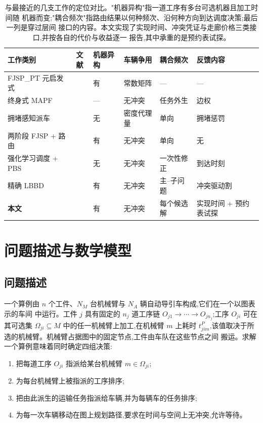 \documentclass[manuscript,screen,review]{acmart}
\begin{document}
\begin{table}[t]
\caption{与最接近的几支工作的定位对比。"机器异构"指一道工序有多台可选机器且加工时间随
机器而变;"耦合频次"指路由结果以何种频次、沿何种方向到达调度决策;最后一列是穿过层间
接口的内容。本文实现了实现时间、冲突凭证与走廊价格三类接口,并按各自的代价与收益逐一
报告,其中承重的是预约表试探。}
\label{tab:related}
\footnotesize
\begin{tabular}{@{}lclll l@{}}
\toprule
工作类别 & 文献 & 机器异构 & 车辆争用 & 耦合频次 & 反馈内容 \\
\midrule
FJSP\_PT 元启发式 & \cite{meng2025cp,qin2026knowledge,fu2025integrated}
  & 有 & 常数矩阵 & --- & --- \\
终身式 MAPF & \cite{zhang2024guidance}
  & --- & 无冲突 & 任务外生 & 边权 \\
拥堵感知派车 & \cite{kim2026congestion}
  & 无 & 密度代理量 & 单向 & 拥堵惩罚 \\
两阶段 FJSP + 路由 & \cite{sun2023integrated}
  & 有 & 无冲突 & 单向 & 无 \\
强化学习调度 + PBS & \cite{li2026framework}
  & 无 & 无冲突 & 一次性修正 & 到达时刻 \\
精确 LBBD & \cite{vanos2026exact}
  & 有 & 无冲突 & 主--子问题 & 冲突驱动割 \\
\textbf{本文} &
  & 有 & 无冲突 & 每个候选解 & 实现时间 + 预约表试探 \\
\bottomrule
\end{tabular}
\end{table}


\section{问题描述与数学模型}
\label{sec:Chapter_III}
\subsection{问题描述}

一个算例由 $n$ 个工件、$N_M$ 台机械臂与 $N_A$ 辆自动导引车构成,它们在一个以图表示的车间
中运行。工件 $j$ 具有固定的 $n_j$ 道工序链 $O_{j1}\to\cdots\to O_{jn_j}$;工序 $O_{ji}$
可在其可选集 $\Omega_{ji}\subseteq M$ 中的任一机械臂上加工,在机械臂 $m$ 上耗时
$t^P_{jim}$,该值取决于所选的机械臂。机械臂占据图中的固定节点,工件由车队在这些节点之间
搬运。求解一个算例意味着同时确定四组决策:

\begin{enumerate}[label=(\roman*),leftmargin=*,topsep=2pt,itemsep=1pt]
\item 把每道工序 $O_{ji}$ 指派给某台机械臂 $m\in\Omega_{ji}$;
\item 为每台机械臂上被指派的工序排序;
\item 把由此派生的运输任务指派给车辆,并为每辆车的任务排序;
\item 为每一次车辆移动在图上规划路径,要求在时间与空间上无冲突,允许等待。
\end{enumerate}
\end{document}
